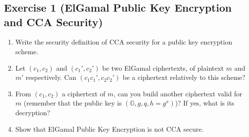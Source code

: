 
\section{}

\subsection{Exercise 1 (ElGamal Public Key Encryption and CCA Security)}

\begin{enumerate}
	\item Write the security definition of CCA security for a public key encryption scheme.
	\item Let $(c_1,c_2)$ and $(c_1',c_2')$ be two ElGamal ciphertexts, of plaintext $m$ and $m'$ respectively. Can $(c_1 c_1',c_2 c_2')$ be a ciphertext relatively to this scheme?
	\item From $(c_1,c_2)$ a ciphertext of $m$, can you build another ciphertext valid for $m$ (remember that the public key is $(\mathbb{G},g,q,h=g^x)$)? If yes, what is its decryption?
	\item Show that ElGamal Public Key Encryption is not CCA secure.
\end{enumerate}


